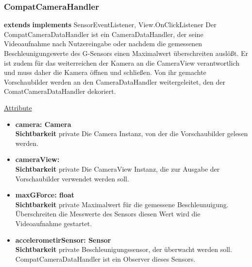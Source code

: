 \subsubsection{CompatCameraHandler} \label{app:klasse:CompatCameraHandler}
\textbf{extends} \newline
\textbf{implements} SensorEventListener, View.OnClickListener \newline
Der CompatCameraDataHandler ist ein CameraDataHandler, der seine Videoaufnahme nach Nutzereingabe oder nachdem die gemessenen Beschleunigungswerte des G-Sensors einen Maximalwert überschreiten auslößt. Er ist zudem für das weiterreichen der Kamera an die CameraView verantwortlich und muss daher die Kamera öffnen und schließen. Von ihr gemachte Vorschaubilder werden an den CameraDataHandler weitergeleitet, den der ComatCameraDataHandler dekoriert.
\newline

\underline{Attribute}
\begin{itemize}
\itemsep0pt

\item \textbf{camera: Camera} \hfill\\ 
\textbf{Sichtbarkeit} private \newline
Die Camera Instanz, von der die Vorschaubilder gelesen werden.

\item \textbf{cameraView: } \hfill\\ 
\textbf{Sichtbarkeit} private \newline
Die CameraView Instanz, die zur Ausgabe der Vorschaubilder verwendet werden soll.

\item \textbf{maxGForce: float} \hfill\\ 
\textbf{Sichtbarkeit} private \newline
Maximalwert für die gemessene Beschleunuigung. Überschreiten die Messwerte des Sensors diesen Wert wird die Videoaufnahme gestartet.

\item \textbf{accelerometirSensor: Sensor} \hfill\\ 
\textbf{Sichtbarkeit} private \newline
Beschleunigungssensor, der überwacht werden soll. CompatCameraDataHandler ist ein Observer dieses Sensors.

\end{itemize}


